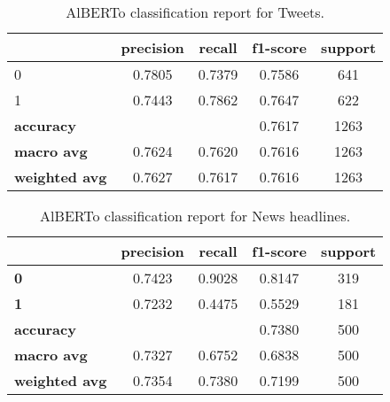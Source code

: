 \begin{table}[h]
    \centering
    \small
    \begin{tabular}{lcccc}
        \toprule
        & \textbf{precision} & \textbf{recall} & \textbf{f1-score} & \textbf{support} \\
        \midrule
        0 & 0.7805 & 0.7379 & 0.7586 & 641 \\
        1 & 0.7443 & 0.7862 & 0.7647 & 622 \\
        \midrule
        \textbf{accuracy} & & & 0.7617 & 1263 \\
        \textbf{macro avg} & 0.7624 & 0.7620 & 0.7616 & 1263 \\
        \textbf{weighted avg} & 0.7627 & 0.7617 & 0.7616 & 1263 \\
        \bottomrule
    \end{tabular}
    \caption{AlBERTo classification report for Tweets.}
    \label{tab:classification_report_alberto_tweets}
\end{table}

\begin{table}[h]
    \centering
    \small
    \begin{tabular}{lcccc}
        \toprule
                     & \textbf{precision} & \textbf{recall} & \textbf{f1-score} & \textbf{support} \\
        \midrule
        \textbf{0}          & 0.7423  & 0.9028 & 0.8147  & 319 \\
        \textbf{1}          & 0.7232  & 0.4475 & 0.5529  & 181 \\
        \midrule
        \textbf{accuracy}   &         &        & 0.7380  & 500 \\
        \textbf{macro avg}  & 0.7327  & 0.6752 & 0.6838  & 500 \\
        \textbf{weighted avg} & 0.7354  & 0.7380 & 0.7199  & 500 \\
        \bottomrule
    \end{tabular}
    \caption{AlBERTo classification report for News headlines.}
    \label{tab:classification_report_alberto_news}
\end{table}

